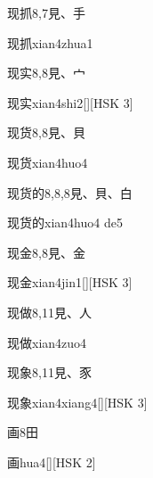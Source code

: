 \begin{entry}{现抓}{8,7}{⾒、⼿}
  \begin{phonetics}{现抓}{xian4zhua1}
  \end{phonetics}
\end{entry}

\begin{entry}{现实}{8,8}{⾒、⼧}
  \begin{phonetics}{现实}{xian4shi2}[][HSK 3]
  \end{phonetics}
\end{entry}

\begin{entry}{现货}{8,8}{⾒、⾙}
  \begin{phonetics}{现货}{xian4huo4}
  \end{phonetics}
\end{entry}

\begin{entry}{现货的}{8,8,8}{⾒、⾙、⽩}
  \begin{phonetics}{现货的}{xian4huo4 de5}
  \end{phonetics}
\end{entry}

\begin{entry}{现金}{8,8}{⾒、⾦}
  \begin{phonetics}{现金}{xian4jin1}[][HSK 3]
  \end{phonetics}
\end{entry}

\begin{entry}{现做}{8,11}{⾒、⼈}
  \begin{phonetics}{现做}{xian4zuo4}
  \end{phonetics}
\end{entry}

\begin{entry}{现象}{8,11}{⾒、⾗}
  \begin{phonetics}{现象}{xian4xiang4}[][HSK 3]
  \end{phonetics}
\end{entry}

\begin{entry}{画}{8}{⽥}
  \begin{phonetics}{画}{hua4}[][HSK 2]
  \end{phonetics}
\end{entry}

